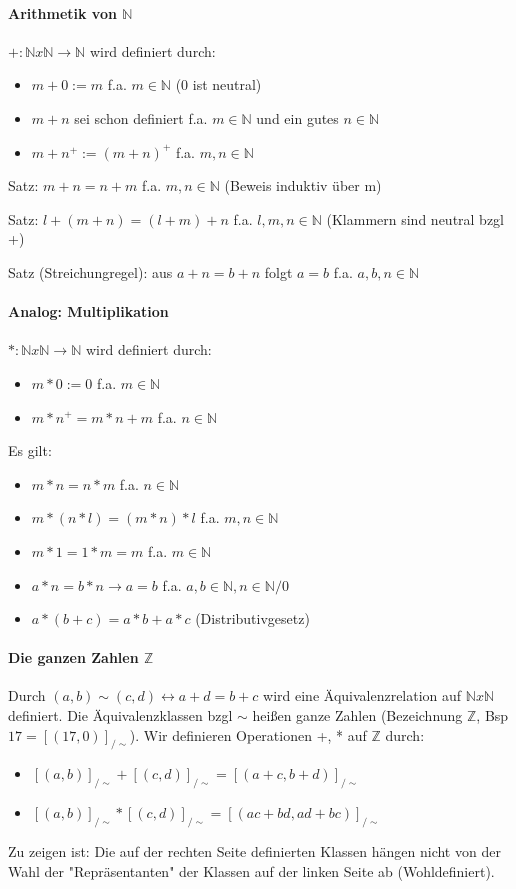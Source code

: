 \documentclass[10pt,landscape]{article}
\begin{document}
\begin{multicols}{3}
\paragraph{Arithmetik von $\mathbb{N}$}
$+: \mathbb{N} x \mathbb{N} \rightarrow \mathbb{N}$ wird definiert durch:
\begin{itemize}
    \item $m+0:=m$ f.a. $m\in \mathbb{N}$ (0 ist neutral)
    \item $m+n$ sei schon definiert f.a. $m\in \mathbb{N}$ und ein gutes $n\in \mathbb{N}$
    \item $m+n^+:=(m+n)^+$ f.a. $m,n \in \mathbb{N}$
\end{itemize}

Satz: $m+n=n+m$ f.a. $m,n\in\mathbb{N}$ (Beweis induktiv über m)

Satz: $l+(m+n)=(l+m)+n$ f.a. $l,m,n\in\mathbb{N}$ (Klammern sind neutral bzgl +)

Satz (Streichungregel): aus $a+n=b+n$ folgt $a=b$ f.a. $a,b,n\in\mathbb{N}$

\paragraph{Analog: Multiplikation}
$*: \mathbb{N} x \mathbb{N} \rightarrow \mathbb{N}$ wird definiert durch:
\begin{itemize}
    \item $m*0:=0$ f.a. $m\in \mathbb{N}$
    \item $m*n^+=m*n+m$ f.a. $n\in\mathbb{N}$
\end{itemize}
Es gilt:
\begin{itemize}
    \item $m*n=n*m$ f.a. $n\in\mathbb{N}$
    \item $m*(n*l)=(m*n)*l$ f.a. $m,n\in\mathbb{N}$
    \item $m*1 = 1*m =m$ f.a. $m\in\mathbb{N}$
    \item $a*n=b*n \rightarrow a=b$ f.a. $a,b\in\mathbb{N}, n\in\mathbb{N}/{0}$
    \item $a*(b+c)=a*b+a*c$ (Distributivgesetz)
\end{itemize}

\paragraph{Die ganzen Zahlen $\mathbb{Z}$}
Durch $(a,b)\sim (c,d)\leftrightarrow a+d=b+c$ wird eine Äquivalenzrelation auf $\mathbb{N} x\mathbb{N}$ definiert.
Die Äquivalenzklassen bzgl $\sim$ heißen ganze Zahlen (Bezeichnung $\mathbb{Z}$, Bsp $17=[(17,0)]_{/\sim }$).
Wir definieren Operationen +, * auf $\mathbb{Z}$ durch:
\begin{itemize}
    \item $[(a,b)]_{/\sim } + [(c,d)]_{/\sim } = [(a+c, b+d)]_{/\sim }$
    \item $[(a,b)]_{/\sim } * [(c,d)]_{/\sim } = [(ac+bd, ad+bc)]_{/\sim }$
\end{itemize}
Zu zeigen ist: Die auf der rechten Seite definierten Klassen hängen nicht von der Wahl der "Repräsentanten" der Klassen auf der linken Seite ab (Wohldefiniert).


\end{multicols}
\end{document}
